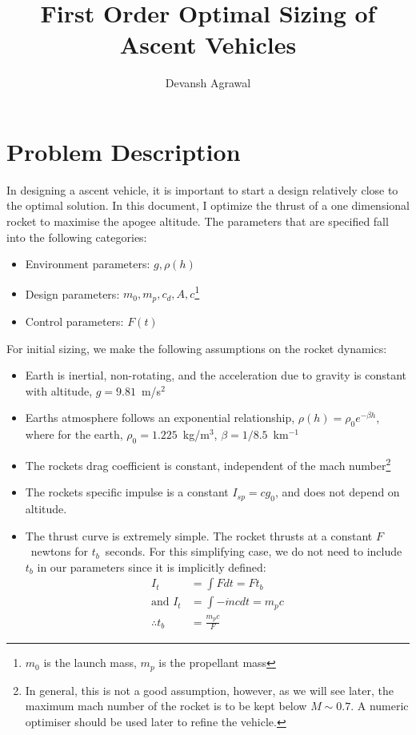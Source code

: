 \documentclass[12pt]{article}
\title{First Order Optimal Sizing of Ascent Vehicles}
\author{Devansh Agrawal}
\begin{document}
\maketitle


\section{Problem Description}

In designing a ascent vehicle, it is important to start a design relatively close to the optimal solution. In this document, I optimize the thrust of a one dimensional rocket to maximise the apogee altitude. The parameters that are specified fall into the following categories:
\begin{itemize}
\item Environment parameters: $g, \rho(h)$
\item Design parameters: $m_0, m_p, c_d, A,c$\footnote{$m_0$ is the launch mass, $m_p$ is the propellant mass}
\item Control parameters: $F(t)$
\end{itemize}

For initial sizing, we make the following assumptions on the rocket dynamics:
\begin{itemize}
\item Earth is inertial, non-rotating, and the acceleration due to gravity is constant with altitude, $g = 9.81$~m/s$^2$
\item Earths atmosphere follows an exponential relationship, $\rho(h) = \rho_0 e^{-\beta h}$, where for the earth, $\rho_0 = 1.225$~kg/m$^3$, $\beta = 1/8.5$~km$^{-1}$
\item The rockets drag coefficient is constant, independent of the mach number\footnote{In general, this is not a good assumption, however, as we will see later, the maximum mach number of the rocket is to be kept below $M\sim0.7$. A numeric optimiser should be used later to refine the vehicle.}
\item The rockets specific impulse is a constant $I_{sp} = c g_0$, and does not depend on altitude.
\item The thrust curve is extremely simple. The rocket thrusts at a constant $F$~newtons for $t_b$~seconds. For this simplifying case, we do not need to include $t_b$ in our parameters since it is implicitly defined:
\begin{align}
I_t &= \int F dt = F t_b\\
\text{and } I_t &= \int -\dot{m} c dt  = m_p c\\
\therefore t_b &= \frac{m_p c}{F}
\end{align}
\end{itemize}
\end{document}
